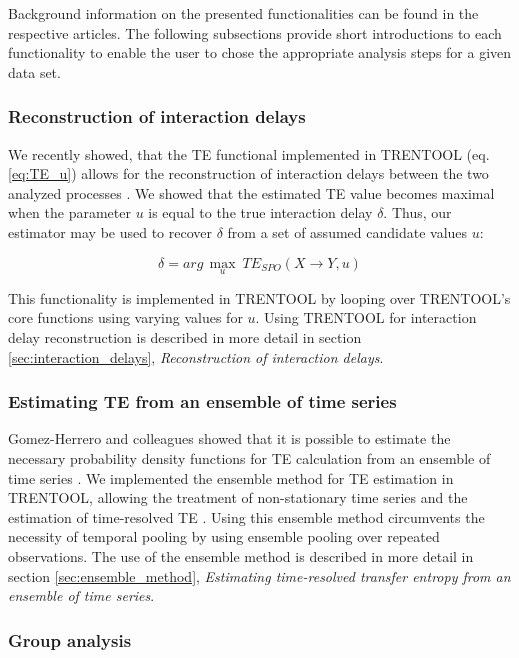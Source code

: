 \documentclass[a4paper,10pt]{article}
\begin{document}
Background information on the presented functionalities can be found in the respective articles. The following subsections provide short introductions to each functionality to enable the user to chose the appropriate analysis steps for a given data set.

\subsubsection{Reconstruction of interaction delays}

We recently showed, that the TE functional implemented in TRENTOOL (eq. \ref{eq:TE_u}) allows for the reconstruction of interaction delays between the two analyzed processes \cite{wibral2013}. We showed that the estimated TE value becomes maximal when the parameter $u$ is equal to the true interaction delay $\delta$. Thus, our estimator may be used to recover $\delta$ from a set of assumed candidate values $u$:

\begin{equation}
  \label{eq:delta_max}
  \delta = arg\,\operatorname*{max}_u \  TE_{SPO}(X \rightarrow Y,u)
\end{equation}

This functionality is implemented in TRENTOOL by looping over TRENTOOL's core functions using varying values for $u$. Using TRENTOOL for interaction delay reconstruction is described in more detail in section \ref{sec:interaction_delays}, \textit{Reconstruction of interaction delays}.


\subsubsection{Estimating TE from an ensemble of time series}

Gomez-Herrero and colleagues showed that it is possible to estimate the necessary probability density functions for TE calculation from an ensemble of time series \cite{gomez-herrero2010}. We implemented the ensemble method for TE estimation in TRENTOOL, allowing the treatment of non-stationary time series and the estimation of time-resolved TE \cite{wollstadt2013}. Using this ensemble method circumvents the necessity of temporal pooling by using ensemble pooling over repeated observations. The use of the ensemble method is described in more detail in section \ref{sec:ensemble_method}, \textit{Estimating time-resolved transfer entropy from an ensemble of time series}.

\subsubsection{Group analysis}
\end{document}
